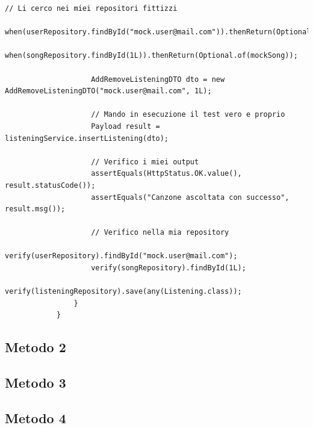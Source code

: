 \documentclass{article}
\begin{document}
\begin{lstlisting}[style=JavaStyle, caption={Il tuo codice Java}, label={lst:java_code}]
					// Li cerco nei miei repositori fittizzi
					when(userRepository.findById("mock.user@mail.com")).thenReturn(Optional.of(mockUser));
					when(songRepository.findById(1L)).thenReturn(Optional.of(mockSong));
					
					AddRemoveListeningDTO dto = new AddRemoveListeningDTO("mock.user@mail.com", 1L);
					
					// Mando in esecuzione il test vero e proprio
					Payload result = listeningService.insertListening(dto);
					
					// Verifico i miei output
					assertEquals(HttpStatus.OK.value(), result.statusCode());
					assertEquals("Canzone ascoltata con successo", result.msg());
					
					// Verifico nella mia repository
					verify(userRepository).findById("mock.user@mail.com");
					verify(songRepository).findById(1L);
					verify(listeningRepository).save(any(Listening.class));
				}
			}
		\end{lstlisting}
		
		\subsection{Metodo 2}
		\subsection{Metodo 3}
		\subsection{Metodo 4}
		\newpage
\end{document}
